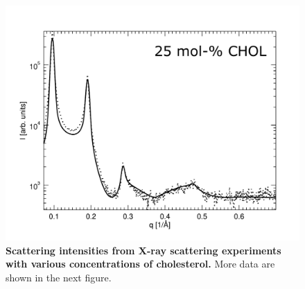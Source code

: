 \documentclass[journal=jpcbfk,manuscript=suppinfo]{achemso}
\begin{document}
\begin{figure}[htb!]
    \includegraphics[width=0.45\linewidth]{../FIGS/scatt25.pdf}
    \caption{\textbf{Scattering intensities from X-ray scattering experiments with various concentrations of cholesterol.} More data are shown in the next figure.}
    \label{SIfig:scattering1}
\end{figure}

\clearpage
\end{document}
